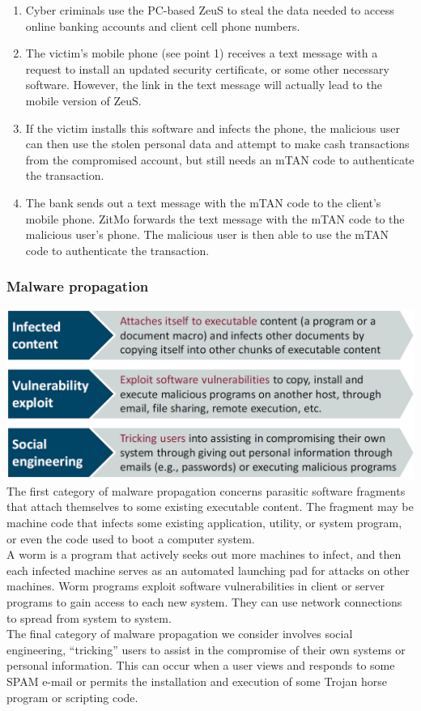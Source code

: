 \documentclass[12pt]{article}
\begin{document}
 \begin{enumerate}
 	\item Cyber criminals use the PC-based ZeuS to steal the data needed to access online banking accounts and client cell phone numbers.
 	\item The victim’s mobile phone (see point 1) receives a text message with a request to install an updated security certificate, or some other necessary software. However, the link in the text message will actually lead to the mobile version of ZeuS.
 	\item If the victim installs this software and infects the phone, the malicious user can then use the stolen personal data and attempt to make cash transactions from the compromised account, but still needs an mTAN code to authenticate the transaction.
 	\item The bank sends out a text message with the mTAN code to the client’s mobile phone. ZitMo forwards the text message with the mTAN code to the malicious user’s phone. The malicious user is then able to use the mTAN code to authenticate the transaction.
 \end{enumerate}
 \subsubsection{Malware propagation}
 \includegraphics[width=\linewidth]{./slides/L8P3MWP.PNG}\\
 The first category of malware propagation concerns parasitic software fragments that attach themselves to some existing executable content. The fragment may be machine code that infects some existing application, utility, or system program, or even the code used to boot a computer system.\\
 A worm is a program that actively seeks out more machines to infect, and then each infected machine serves as an automated launching pad for attacks on other machines. Worm programs exploit software vulnerabilities in client or server programs to gain access to each new system. They can use network connections to spread from system to system.\\
 The final category of malware propagation we consider involves social engineering, “tricking” users to assist in the compromise of their own systems or personal information. This can occur when a user views and responds to some SPAM e-mail or permits the installation and execution of some Trojan horse program or scripting code.
\end{document}
